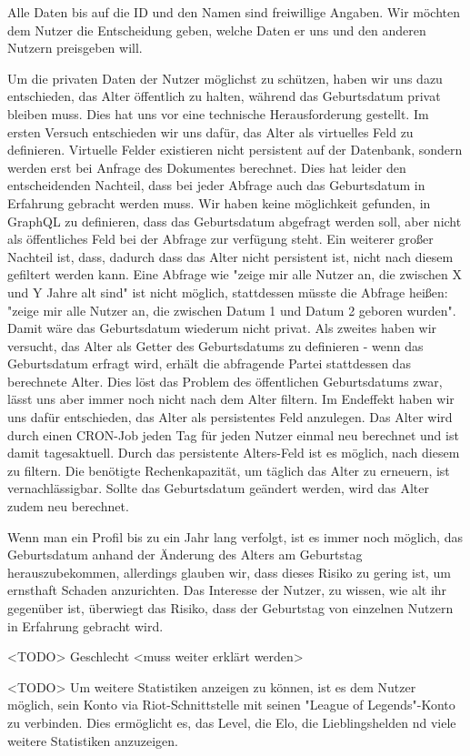 Alle Daten bis auf die ID und den Namen sind freiwillige Angaben. Wir möchten dem Nutzer die Entscheidung geben, welche Daten er uns und den anderen Nutzern preisgeben will.

Um die privaten Daten der Nutzer möglichst zu schützen, haben wir uns dazu entschieden, das Alter öffentlich zu halten, während das Geburtsdatum privat bleiben muss. Dies hat uns vor eine technische Herausforderung gestellt.
Im ersten Versuch entschieden wir uns dafür, das Alter als virtuelles Feld zu definieren. Virtuelle Felder existieren nicht persistent auf der Datenbank, sondern werden erst bei Anfrage des Dokumentes berechnet. Dies hat leider den entscheidenden Nachteil, dass bei jeder Abfrage auch das Geburtsdatum in Erfahrung gebracht werden muss. Wir haben keine möglichkeit gefunden, in GraphQL zu definieren, dass das Geburtsdatum abgefragt werden soll, aber nicht als öffentliches Feld bei der Abfrage zur verfügung steht. Ein weiterer großer Nachteil ist, dass, dadurch dass das Alter nicht persistent ist, nicht nach diesem gefiltert werden kann. Eine Abfrage wie "zeige mir alle Nutzer an, die zwischen X und Y Jahre alt sind" ist nicht möglich, stattdessen müsste die Abfrage heißen: "zeige mir alle Nutzer an, die zwischen Datum 1 und Datum 2 geboren wurden". Damit wäre das Geburtsdatum wiederum nicht privat.
Als zweites haben wir versucht, das Alter als Getter des Geburtsdatums zu definieren - wenn das Geburtsdatum erfragt wird, erhält die abfragende Partei stattdessen das berechnete Alter. Dies löst das Problem des öffentlichen Geburtsdatums zwar, lässt uns aber immer noch nicht nach dem Alter filtern.
Im Endeffekt haben wir uns dafür entschieden, das Alter als persistentes Feld anzulegen. Das Alter wird durch einen CRON-Job jeden Tag für jeden Nutzer einmal neu berechnet und ist damit tagesaktuell. Durch das persistente Alters-Feld ist es möglich, nach diesem zu filtern. Die benötigte Rechenkapazität, um täglich das Alter zu erneuern, ist vernachlässigbar. Sollte das Geburtsdatum geändert werden, wird das Alter zudem neu berechnet.

Wenn man ein Profil bis zu ein Jahr lang verfolgt, ist es immer noch möglich, das Geburtsdatum anhand der Änderung des Alters am Geburtstag herauszubekommen, allerdings glauben wir, dass dieses Risiko zu gering ist, um ernsthaft Schaden anzurichten. Das Interesse der Nutzer, zu wissen, wie alt ihr gegenüber ist, überwiegt das Risiko, dass der Geburtstag von einzelnen Nutzern in Erfahrung gebracht wird.

<TODO> Geschlecht <muss weiter erklärt werden>

<TODO> Um weitere Statistiken anzeigen zu können, ist es dem Nutzer möglich, sein Konto via Riot-Schnittstelle mit seinen "League of Legends"-Konto zu verbinden. Dies ermöglicht es, das Level, die Elo, die Lieblingshelden nd viele weitere Statistiken anzuzeigen.